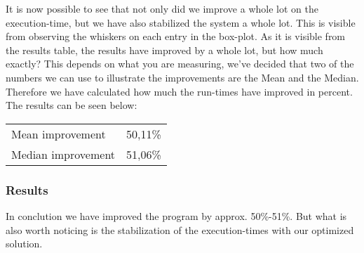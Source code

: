 \documentclass{article}
\begin{document}
It is now possible to see that not only did we improve a whole lot on the execution-time,
but we have also stabilized the system a whole lot. This is visible from observing the 
whiskers on each entry in the box-plot. 
As it is visible from the results table, the results have improved by a whole lot, 
but how much exactly? This depends on what you are measuring, we've decided that 
two of the numbers we can use to illustrate the improvements are the Mean and the 
Median. Therefore we have calculated how much the run-times have improved in percent. 
The results can be seen below: \newline

\begin{tabular}{ l l }
Mean improvement & 50,11\% \\
Median improvement & 51,06\% \\ 
\end{tabular}

\subsubsection*{Results}
In conclution we have improved the program by approx. 50\%-51\%. 
But what is also worth noticing is the stabilization of the execution-times
with our optimized solution. 
\end{document}
